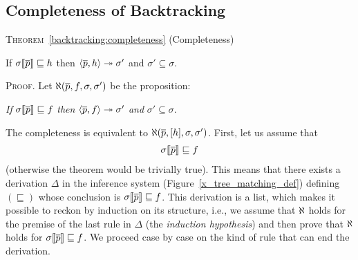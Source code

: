 
\subsection{Completeness of Backtracking}
\label{backtracking:completeness_proof}

\noindent \textsc{Theorem}~\ref{backtracking:completeness}
(Completeness)\hfill
\begin{center}
If   \(\subst{\overline{p}}{\sigma} \sqsubseteq h\)
then \(\smat{h}{\overline{p}} \twoheadrightarrow \sigma'\) 
and  \(\sigma' \subseteq \sigma\).
\end{center}

\noindent \textsc{Proof}. Let \(\ind{W}(\overline{p}, f, \sigma,
\sigma')\) be the proposition:
\begin{center}
\emph{If}   \(\subst{\overline{p}}{\sigma} \sqsubseteq f\)
\emph{then} \(\smj{f}{\overline{p}}{\sigma'}\)
\emph{and} \(\sigma' \subseteq \sigma\).
\end{center}
The completeness is equivalent to \(\ind{W}(\overline{p}, [h], \sigma,
\sigma')\). First, let us assume that
\begin{align}
  \subst{\overline{p}}{\sigma} \sqsubseteq f \label{x:compl:1}
\end{align}
(otherwise the theorem would be trivially true). This means that there
exists a derivation \(\Delta\) in the inference system
(Figure~\ref{x_tree_matching_def}) defining \((\sqsubseteq)\) whose
conclusion is \(\subst{\overline{p}}{\sigma} \sqsubseteq f\). This
derivation is a list, which makes it possible to reckon by induction
on its structure, i.e., we assume that \(\ind{W}\) holds for the
premise of the last rule in \(\Delta\) (the \emph{induction
hypothesis}) and then prove that \(\ind{W}\) holds for
\(\subst{\overline{p}}{\sigma} \sqsubseteq f\). We proceed case by
case on the kind of rule that can end the derivation.
